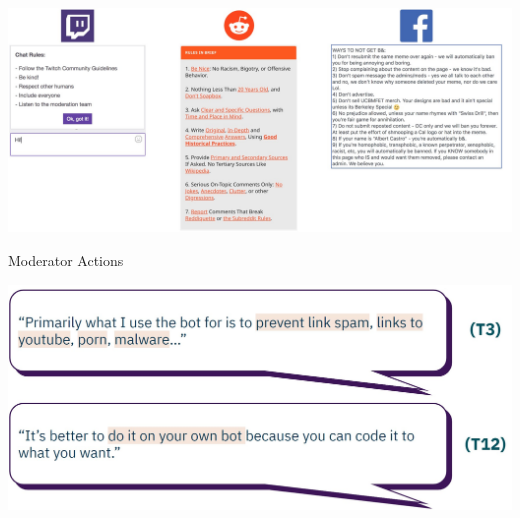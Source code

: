 \documentclass[nobackground,dvipsnames,table]{beamer}
\begin{document}
\begin{frame}{}

\includegraphics[width=\textwidth]{img/fig20.jpg}

\end{frame}



\begin{frame}{Moderator Actions}

\includegraphics[width=\textwidth]{img/fig21.jpg}

\end{frame}
\end{document}
